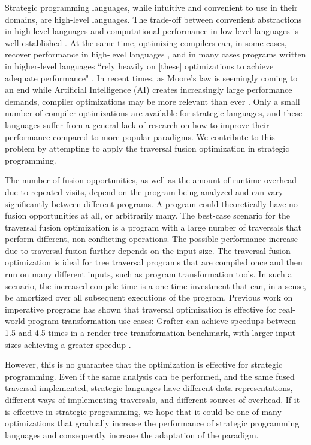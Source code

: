 Strategic programming languages, while intuitive and convenient to use in their domains, are high-level languages. The trade-off between convenient abstractions in high-level languages and computational performance in low-level languages is well-established \cite{SiskindP16a, Kovacs24}. At the same time, optimizing compilers can, in some cases, recover performance in high-level languages \cite{Mainland17}, and in many cases programs written in higher-level languages ``rely heavily on [these] optimizations to achieve adequate performance" \cite{Kovacs24}. In recent times, as Moore's law is seemingly coming to an end while Artificial Intelligence (AI) creates increasingly large performance demands, compiler optimizations may be more relevant than ever \cite{ZHANG2023}. Only  a small number of compiler optimizations are available for strategic languages, and these languages suffer from a general lack of research on how to improve their performance compared to more popular paradigms. We contribute to this problem by attempting to apply the traversal fusion optimization in strategic programming.

The number of fusion opportunities, as well as the amount of runtime overhead due to repeated visits, depend on the program being analyzed and can vary significantly between different programs. A program could theoretically have no fusion opportunities at all, or arbitrarily many. The best-case scenario for the traversal fusion optimization is a program with a large number of traversals that perform different, non-conflicting operations. The possible performance increase due to traversal fusion further depends on the input size. The traversal fusion optimization is ideal for tree traversal programs that are compiled once and then run on many different inputs, such as program transformation tools. In such a scenario, the increased compile time is a one-time investment that can, in a sense, be amortized over all subsequent executions of the program. Previous work on imperative programs has shown that traversal optimization is effective for real-world program transformation use cases: Grafter can achieve speedups between 1.5 and 4.5 times in a render tree transformation benchmark, with larger input sizes achieving a greater speedup \cite{SakkaS017, SakkaSN019}. 

However, this is no guarantee that the optimization is effective for strategic programming. Even if the same analysis can be performed, and the same fused traversal implemented, strategic languages have different data representations, different ways of implementing traversals, and different sources of overhead. If it is effective in strategic programming, we hope that it could be one of many optimizations that gradually increase the performance of strategic programming languages and consequently increase the adaptation of the paradigm.

